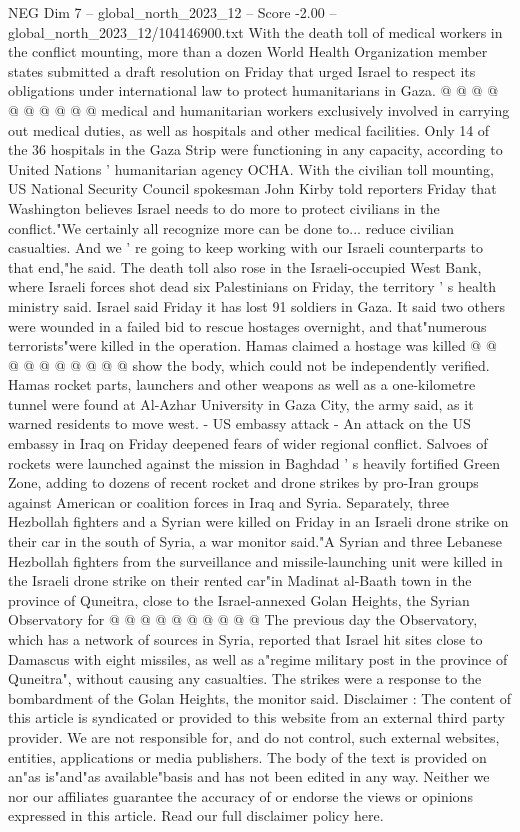 \begin{textsample}{NEG Dim 7 – global\_north\_2023\_12 – Score -2.00 – global\_north\_2023\_12/104146900.txt}
With the death toll of medical workers in the conflict mounting, more than a dozen World Health Organization member states submitted a draft resolution on Friday that urged Israel to respect its obligations under international law to protect humanitarians in Gaza. @ @ @ @ @ @ @ @ @ @ medical and humanitarian workers exclusively involved in carrying out medical duties, as well as hospitals and other medical facilities.
Only 14 of the 36 hospitals in the Gaza Strip were functioning in any capacity, according to United Nations ' humanitarian agency OCHA.
With the civilian toll mounting, US National Security Council spokesman John Kirby told reporters Friday that Washington believes Israel needs to do more to protect civilians in the conflict."We certainly all recognize more can be done to... reduce civilian casualties.
And we ' re going to keep working with our Israeli counterparts to that end,"he said.
The death toll also rose in the Israeli-occupied West Bank, where Israeli forces shot dead six Palestinians on Friday, the territory ' s health ministry said.
Israel said Friday it has lost 91 soldiers in Gaza.
It said two others were wounded in a failed bid to rescue hostages overnight, and that"numerous terrorists"were killed in the operation.
Hamas claimed a hostage was killed @ @ @ @ @ @ @ @ @ @ show the body, which could not be independently verified.
Hamas rocket parts, launchers and other weapons as well as a one-kilometre tunnel were found at Al-Azhar University in Gaza City, the army said, as it warned residents to move west. - US embassy attack - An attack on the US embassy in Iraq on Friday deepened fears of wider regional conflict.
Salvoes of rockets were launched against the mission in Baghdad ' s heavily fortified Green Zone, adding to dozens of recent rocket and drone strikes by pro-Iran groups against American or coalition forces in Iraq and Syria.
Separately, three Hezbollah fighters and a Syrian were killed on Friday in an Israeli drone strike on their car in the south of Syria, a war monitor said."A Syrian and three Lebanese Hezbollah fighters from the surveillance and missile-launching unit were killed in the Israeli drone strike on their rented car"in Madinat al-Baath town in the province of Quneitra, close to the Israel-annexed Golan Heights, the Syrian Observatory for @ @ @ @ @ @ @ @ @ @ The previous day the Observatory, which has a network of sources in Syria, reported that Israel hit sites close to Damascus with eight missiles, as well as a"regime military post in the province of Quneitra", without causing any casualties.
The strikes were a response to the bombardment of the Golan Heights, the monitor said.
Disclaimer : The content of this article is syndicated or provided to this website from an external third party provider.
We are not responsible for, and do not control, such external websites, entities, applications or media publishers.
The body of the text is provided on an"as is"and"as available"basis and has not been edited in any way.
Neither we nor our affiliates guarantee the accuracy of or endorse the views or opinions expressed in this article.
Read our full disclaimer policy here.

\end{textsample}
